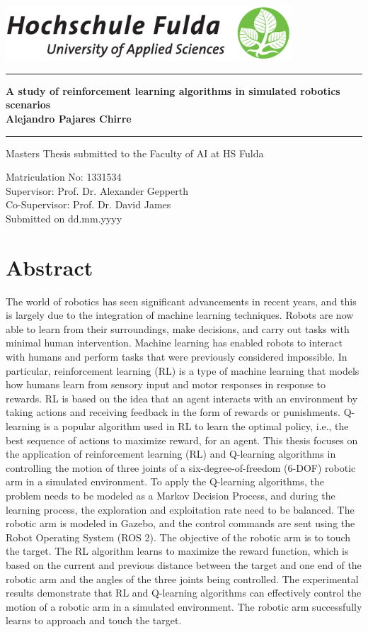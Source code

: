 \documentclass[12pt,oneside]{article}
\newcommand{\HSFTitle}[8]{

  \thispagestyle{empty}
\begin{center}
    \includegraphics[width=0.8\textwidth]{logo.eps} \\
    \vspace*{\stretch{1}}
    \end{center}

  {\parindent0cm
  \rule{\linewidth}{.7ex}}
  \begin{center}
    \vspace*{\stretch{1}}
    \sffamily\bfseries\Huge
    #1\\
    \vspace*{\stretch{1}}
    \sffamily\bfseries\large
    #3
    \vspace*{\stretch{1}}
  \end{center}
  \rule{\linewidth}{.7ex}

  \vspace*{\stretch{2}}
  \begin{center}
    \Large #5 \\
    \vspace*{\stretch{1}}

    \large Matriculation No:  #4 \\[1mm]
    \large Supervisor:  #7 \\[1mm]
    \large Co-Supervisor:  #8 \\[1mm]

    \vspace*{\stretch{1}}
    \large Submitted on #6
  \end{center}
}
\begin{document}
  \HSFTitle
      {A study of reinforcement learning algorithms in simulated robotics scenarios }        %
      {Masters Thesis} %
      {Alejandro Pajares Chirre}          %
      {1331534}
      {Masters Thesis submitted to the Faculty of AI at HS Fulda}  %
      {dd.mm.yyyy}        %
      {Prof. Dr. Alexander Gepperth}     %
      {Prof. Dr. David James}    %

  \clearpage

\lhead{}
    \setcounter{page}{1}

\clearpage
%
\section*{Abstract}

The world of robotics has seen significant advancements in recent years, and this is largely due to the integration of machine learning techniques. Robots are now able to learn from their surroundings, make decisions, and carry out tasks with minimal human intervention. 
Machine learning has enabled robots to interact with humans and perform tasks that were previously considered impossible. In particular, reinforcement learning (RL) is a type of machine learning that models how humans learn from sensory input and motor responses in response to rewards. RL is based on the idea that an agent interacts with an environment by taking actions and receiving feedback in the form of rewards or punishments. Q-learning is a popular algorithm used in RL to learn the optimal policy, i.e., the best sequence of actions to maximize reward, for an agent. 
This thesis focuses on the application of reinforcement learning (RL) and Q-learning algorithms in controlling the motion of three joints of a six-degree-of-freedom (6-DOF) robotic arm in a simulated environment. To apply the Q-learning algorithms, the problem needs to be modeled as a Markov Decision Process, and during the learning process, the exploration and exploitation rate need to be balanced.
The robotic arm is modeled in Gazebo, and the control commands are sent using the Robot Operating System (ROS 2). The objective of the robotic arm is to touch the target. The RL algorithm learns to maximize the reward function, which is based on the current and previous distance between the target and one end of the robotic arm and the angles of the three joints being controlled. 
The experimental results demonstrate that RL and Q-learning algorithms can effectively control the motion of a robotic arm in a simulated environment. The robotic arm successfully learns to approach and touch the target.
\end{document}
